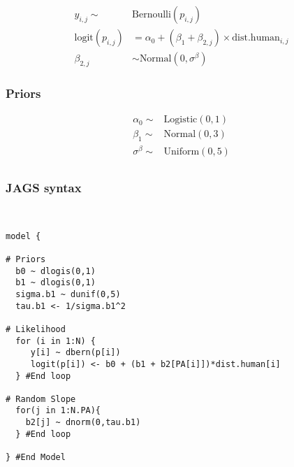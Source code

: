\documentclass[12pt]{article}
\begin{document}
\begin{align*}
y_{i,j}\sim& \text{Bernoulli}(p_{i,j})\\
\text{logit}(p_{i,j}) &= \alpha_{0} + (\beta_1 + \beta_{2,j}) \times \text{dist.human}_{i,j}\\
\beta_{2,j} &\sim \text{Normal}(0, \sigma^{\beta})
\end{align*}

\subsubsection{Priors}

\begin{align*}
\alpha_{0} \sim& \text{Logistic}(0, 1)\\
\beta_{1} \sim& \text{Normal}(0, 3)\\
\sigma^{\beta} \sim& \text{Uniform}(0, 5)\\
\end{align*}

\pagebreak

\subsubsection{JAGS syntax}

\begin{verbatim}


model {

# Priors
  b0 ~ dlogis(0,1)
  b1 ~ dlogis(0,1)
  sigma.b1 ~ dunif(0,5)
  tau.b1 <- 1/sigma.b1^2
  
# Likelihood
  for (i in 1:N) {
     y[i] ~ dbern(p[i])
     logit(p[i]) <- b0 + (b1 + b2[PA[i]])*dist.human[i]
  } #End loop
  
# Random Slope
  for(j in 1:N.PA){
    b2[j] ~ dnorm(0,tau.b1)
  } #End loop
  
} #End Model



\end{verbatim}
\end{document}

